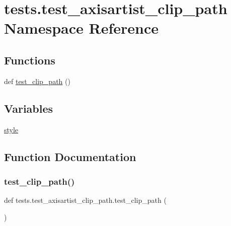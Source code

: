 \hypertarget{namespacetests_1_1test__axisartist__clip__path}{}\section{tests.\+test\+\_\+axisartist\+\_\+clip\+\_\+path Namespace Reference}
\label{namespacetests_1_1test__axisartist__clip__path}
\subsection*{Functions}
\begin{DoxyCompactItemize}
\item 
def \hyperlink{namespacetests_1_1test__axisartist__clip__path_ad9526f2f0e53f22288330fdf84f5ec03}{test\+\_\+clip\+\_\+path} ()
\end{DoxyCompactItemize}
\subsection*{Variables}
\begin{DoxyCompactItemize}
\item 
\hyperlink{namespacetests_1_1test__axisartist__clip__path_af7c7d59d530156a12458c9a88df04ba5}{style}
\end{DoxyCompactItemize}


\subsection{Function Documentation}
\mbox{\label{namespacetests_1_1test__axisartist__clip__path_ad9526f2f0e53f22288330fdf84f5ec03}} 
\subsubsection{\texorpdfstring{test\+\_\+clip\+\_\+path()}{test\_clip\_path()}}
{\footnotesize\ttfamily def tests.\+test\+\_\+axisartist\+\_\+clip\+\_\+path.\+test\+\_\+clip\+\_\+path (\begin{DoxyParamCaption}{ }\end{DoxyParamCaption})}



